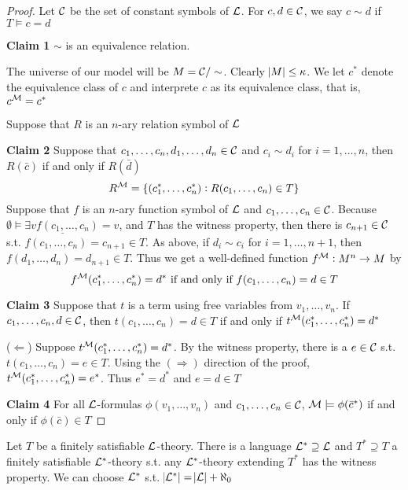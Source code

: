 \documentclass[11pt]{article}
\begin{document}
\begin{proof}
Let \(\mathcal{C}\) be the set of constant symbols of \(\mathcal{L}\). For \(c,d\in\mathcal{C}\),
we say \(c\sim d\) if \(T\models c=d\)

\textbf{Claim 1} \(\sim\) is an equivalence relation. 

The universe of our model will be \(M=\mathcal{C}/\sim\). Clearly
\(\abs{M}\le\kappa\). We let \(c^*\) denote the equivalence class of \(c\) and
interprete \(c\) as its equivalence class, that is, \(c^{\mathcal{M}}=c^*\)

Suppose that \(R\) is an \(n\)-ary relation symbol of \(\mathcal{L}\)

\textbf{Claim 2} Suppose that \(c_1,\dots,c_n,d_1,\dots,d_n\in\mathcal{C}\) and \(c_i\sim d_i\)
for \(i=1,\dots,n\), then \(R(\bar{c})\) if and only if \(R(\bar{d})\)
\begin{equation*}
R^{\mathcal{M}}=\{(c_1^*,\dots,c_n^*):R(c_1,\dots,c_n)\in T\}
\end{equation*}
Suppose that \(f\) is an \(n\)-ary function symbol of \(\mathcal{L}\) and
\(c_1,\dots,c_n\in\mathcal{C}\). Because  \(\underline{\emptyset\models\exists
    vf(c_1,\dots,c_n)=v}\), and \(T\) has the witness property, then there is
\(c_{n+1}\in\mathcal{C}\) s.t. \(f(c_1,\dots,c_n)=c_{n+1}\in T\). As above, if
\(d_i\sim c_i\) for \(i=1,\dots,n+1\), then \(f(d_1,\dots,d_n)=d_{n+1}\in T\).
Thus we get a well-defined function \(f^{\mathcal{M}}:M^n\to M\) by
\begin{equation*}
f^{\mathcal{M}}(c_1^*,\dots,c_n^*)=d^*\text{ if and only if }f(c_1,\dots,c_n)=d\in T
\end{equation*}

\textbf{Claim 3} Suppose that \(t\) is a term using free variables from
\(v_1,\dots,v_n\). If \(c_1,\dots,c_n,d\in\mathcal{C}\), then \(t(c_1,\dots,c_n)=d\in
    T\) if and only if \(t^{\mathcal{M}}(c_1^*,\dots,c_n^*)=d^*\)

(\(\Leftarrow\)) Suppose \(t^{\mathcal{M}}(c_1^*,\dots,c_n^*)=d^*\). By the witness
property, there is a \(e\in\mathcal{C}\) s.t. \(t(c_1,\dots,c_n)=e\in T\). Using the
\((\Rightarrow)\) direction of the proof, \(t^{\mathcal{M}}(c_1^*,\dots,c_n^*)=e^*\).
Thus \(e^*=d^*\) and \(e=d\in T\)


\textbf{Claim 4} For all \(\mathcal{L}\)-formulas \(\phi(v_1,\dots,v_n)\) and
 \(c_1,\dots,c_n\in\mathcal{C}\), \(\mathcal{M}\models\phi(\bar{c}^*)\) if and only if
 \(\phi(\bar{c})\in T\)
\end{proof}

\begin{lemma}[]
Let \(T\) be a finitely satisfiable \(\mathcal{L}\)-theory. There is a language
\(\mathcal{L}^*\supseteq\mathcal{L}\) and \(T^*\supseteq T\) a finitely satisfiable
\(\mathcal{L}^*\)-theory s.t. any \(\mathcal{L}^*\)-theory extending \(T^*\) has the
witness property. We can choose \(\mathcal{L}^*\) s.t.
\(\abs{\mathcal{L}^*}=\abs{\mathcal{L}}+\aleph_0\) 
\end{lemma}
\end{document}
